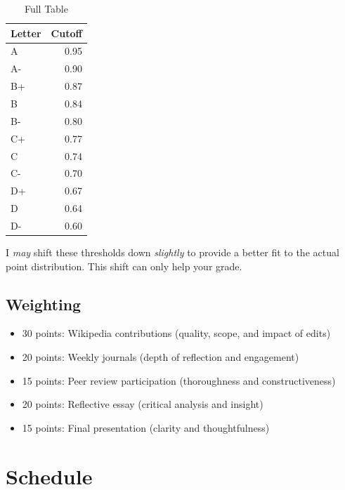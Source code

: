 \documentclass[
]{book}
\providecommand{\tightlist}{%
  \setlength{\itemsep}{0pt}\setlength{\parskip}{0pt}}
\begin{document}
\begin{table}

\caption{\label{tab:unnamed-chunk-5}Full Table}
\centering
\begin{tabular}[t]{l|r}
\hline
Letter & Cutoff\\
\hline
A & 0.95\\
\hline
A- & 0.90\\
\hline
B+ & 0.87\\
\hline
B & 0.84\\
\hline
B- & 0.80\\
\hline
C+ & 0.77\\
\hline
C & 0.74\\
\hline
C- & 0.70\\
\hline
D+ & 0.67\\
\hline
D & 0.64\\
\hline
D- & 0.60\\
\hline
\end{tabular}
\end{table}

I \emph{may} shift these thresholds down \emph{slightly} to provide a better fit to the actual point distribution. This shift can only help your grade.

\subsection*{Weighting}\label{weighting-1}


\begin{itemize}
\tightlist
\item
  30 points: Wikipedia contributions (quality, scope, and impact of edits)
\item
  20 points: Weekly journals (depth of reflection and engagement)
\item
  15 points: Peer review participation (thoroughness and constructiveness)
\item
  20 points: Reflective essay (critical analysis and insight)
\item
  15 points: Final presentation (clarity and thoughtfulness)
\end{itemize}

\section*{Schedule}\label{schedule-3}
\end{document}

